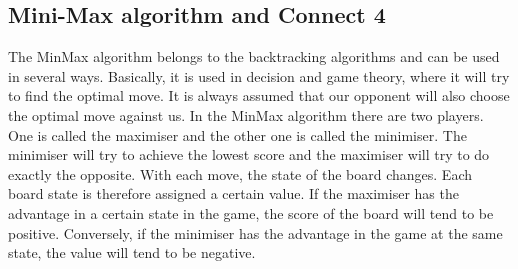 \documentclass[conference,pdf,table,xcdraw, utf8]{IEEEtran}
\begin{document}
\subsection{Mini-Max algorithm and Connect 4}
The MinMax algorithm belongs to the backtracking algorithms and can be used in several ways. Basically, it is used in decision and game theory, where it will try to find the optimal move. It is always assumed that our opponent will also choose the optimal move against us. In the MinMax algorithm there are two players. One is called the maximiser and the other one is called the minimiser. The minimiser will try to achieve the lowest score and the maximiser will try to do exactly the opposite. With each move, the state of the board changes. Each board state is therefore assigned a certain value. If the maximiser has the advantage in a certain state in the game, the score of the board will tend to be positive. Conversely, if the minimiser has the advantage in the game at the same state, the value will tend to be negative.~\cite{MinMaxConnect4}
\end{document}
